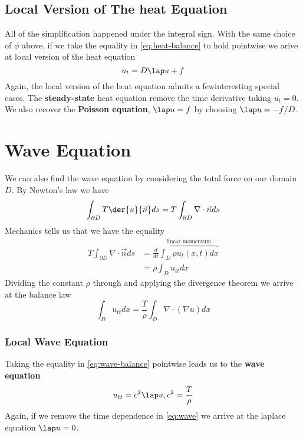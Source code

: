 \documentclass{bkcnotes}
\begin{document}
\subsection{Local Version of The heat Equation}
All of the simplification happened under the integral sign. With the
same choice of $\phi$ above, if we take the equality in
\eqref{eq:heat-balance} to hold pointwise we arive at local version of
the heat equation
\begin{equation}
  \label{eq:heat}
  u_t = D\lap u + f
\end{equation}
Again, the local version of the heat equation admits a fewinteresting
special cases. The \textbf{steady-state} heat equation remove the time
derivative taking $u_t = 0$. We also recover the \textbf{Poisson
  equation}, $\lap u = f$ by choosing $\lap u = -f / D$.

\section{Wave Equation}
We can also find the wave equation by considering the total force on
our domain $D$. By Newton's law we have
\begin{equation}
  \label{eq:newton}
  \int_{\partial D} T \der{u}{\vec{n}}ds = T \int_{\partial D} \nabla \cdot \vec{n}ds
\end{equation}
Mechanics tells us that we have the equality
\begin{equation}
  \begin{aligned}
    T \int_{\partial D} \nabla \cdot \vec{n}ds &=
    \frac{d}{dt}\overbrace{\int_{D}\rho u_t(x,t)dx}^{\text{linear
        momentum}} \\
    &= \rho\int_D u_{tt}dx
  \end{aligned}  
\end{equation}
Dividing the constant $\rho$ through and applying the divergence
theorem we arrive at the balance law
\begin{equation}
  \label{eq:wave-balance}
  \int_{D} u_{tt}dx = \frac{T}{\rho}\int_{D} \nabla \cdot (\nabla u)dx
\end{equation}

\subsubsection{Local Wave Equation}
Taking the equality in \eqref{eq:wave-balance} pointwise leads us to the
\textbf{wave equation}
\begin{equation}
  \label{eq:wave}
  u_{tt} = c^2\lap u, c^2 = \frac{T}{\rho}
\end{equation}
Again, if we remove the time dependence in \eqref{eq:wave} we arrive at the
laplace equation $\lap u = 0$.
\end{document}
